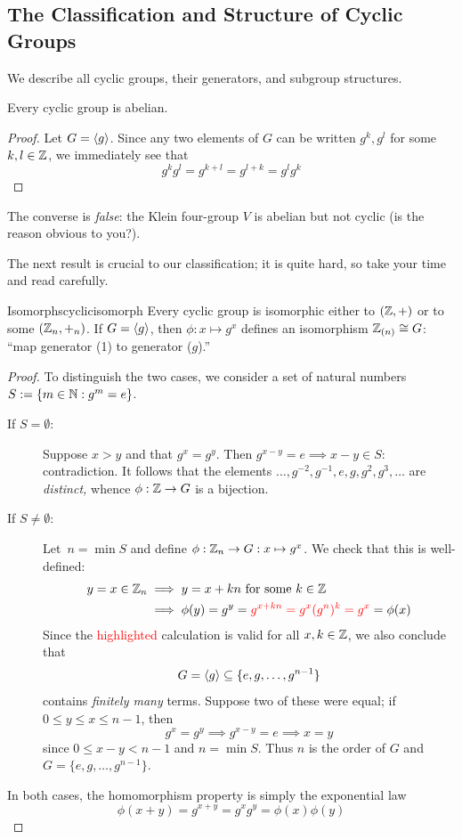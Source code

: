 \clearpage




\subsection{The Classification and Structure of Cyclic Groups}\label{sec:cyclicclass}

We describe all cyclic groups, their generators, and subgroup structures.

\begin{lemm}{}{}
	Every cyclic group is abelian.
\end{lemm}

\begin{proof}
	Let $G=\left\langle g\right\rangle$. Since any two elements of $G$ can be written $g^k,g^l$ for some $k,l\in\mathbb{Z}$, we immediately see that
	\[
		g^kg^l=g^{k+l}=g^{l+k}=g^lg^k\tag*{\qedhere}
	\]
\end{proof}

The converse is \emph{false}: the Klein four-group $V$ is abelian but not cyclic (is the reason obvious to you?).\smallbreak

The next result is crucial to our classification; it is quite hard, so take your time and read carefully.


\begin{thm}{Isomorphs}{cyclicisomorph}
	Every cyclic group is isomorphic either to $(\mathbb{Z},+)$ or to some $(\mathbb{Z}_n,+_n)$.\smallbreak
	If $G=\left\langle g\right\rangle$, then $\phi:x\mapsto g^x$ defines an isomorphism $\mathbb{Z}_{(n)}\cong G$: ``map generator (1) to generator ($g$).''
\end{thm}

\begin{proof}
	To distinguish the two cases, we consider a set of natural numbers $S:=\{m\in\mathbb{N}:g^m=e\}$.
	\begin{description}
		\item[\normalfont If $S=\emptyset$:] Suppose $x>y$ and that $g^x=g^y$. Then $g^{x-y}=e\implies x-y\in S$: contradiction. It follows that the elements $\ldots,g^{-2},g^{-1},e,g,g^2,g^3,\ldots$ are \emph{distinct,} whence $\phi:\mathbb{Z}\to G$ is a bijection.
		\item[\normalfont If $S\neq\emptyset$:] Let\footnotemark\ $n=\min S$ and define $\phi:\mathbb{Z}_n\to G:x\mapsto g^x$.  We check that this is well-defined:
		\begin{align*}
			y=x\in\mathbb{Z}_n&\implies y=x+kn\text{ for some $k\in\mathbb{Z}$}\\
			&\implies \phi(y)=g^y=\textcolor{red}{g^{x+kn}=g^x(g^n)^k=g^x}=\phi(x)
		\end{align*}
		Since the \textcolor{red}{highlighted} calculation is valid for all $x,k\in\mathbb{Z}$, we also conclude that
		\[
			G=\left\langle g\right\rangle\subseteq\{e,g,\ldots,g^{n-1}\}
		\]
		contains \emph{finitely many} terms. Suppose two of these were equal; if $0\le y\le x\le n-1$, then
		\[
			g^x=g^y\implies g^{x-y}=e\implies x=y
		\]
		since $0\le x-y<n-1$ and $n=\min S$. Thus $n$ is the order of $G$ and $G=\{e,g,\ldots,g^{n-1}\}$.
	\end{description}
	In both cases, the homomorphism property is simply the exponential law
	\[
		\phi(x+y)=g^{x+y}=g^xg^y=\phi(x)\phi(y)\tag*{\qedhere}
	\]
\end{proof}

